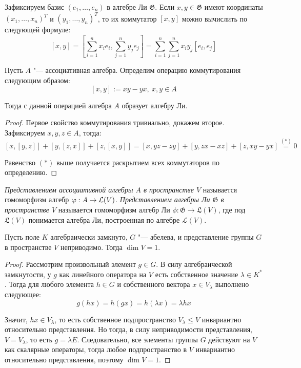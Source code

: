 \begin{note}
	Зафиксируем базис $(e_1, \dotsc, e_n)$ в алгебре Ли $\mathfrak G$. Если $x, y \in \mathfrak G$ имеют координаты $(x_1, \dotsc, x_n)^T$ и $(y_1, \dotsc, y_n)^T$, то их коммутатор $[x, y]$ можно вычислить по следующей формуле:
	\[[x, y] = \left[\sum_{i=1}^nx_ie_i, \sum_{j=1}^ny_je_j\right] = \sum_{i=1}^n\sum_{j=1}^nx_iy_j[e_i, e_j]\]
\end{note}

\begin{proposition}
	Пусть $A$ "--- ассоциативная алгебра. Определим операцию коммутирования следующим образом:
	\[[x, y] := xy - yx,~x, y \in A\]
	
	Тогда с данной операцией алгебра $A$ образует алгебру Ли.
\end{proposition}

\begin{proof}
	Первое свойство коммутирования тривиально, докажем второе. Зафиксируем $x, y, z \in A$, тогда:
	\[[x, [y, z]] + [y, [z, x]] + [z, [x, y]] = [x, yz - zy] + [y, zx - xz] + [z, xy - yx] \stackrel{(*)}{=} 0\]
	
	Равенство $(*)$ выше получается раскрытием всех коммутаторов по определению.
\end{proof}

\begin{definition}
	\textit{Представлением ассоциативной алгебры $A$ в пространстве $V$} называется гомоморфизм алгебр $\varphi : A \to \mathcal L(V)$. \textit{Представлением алгебры Ли $\mathfrak G$ в пространстве $V$} называется гомоморфизм алгебр Ли $\phi : \mathfrak{G} \to \mathfrak{L}(V)$, где под $\mathfrak{L}(V)$ понимается алгебра Ли, построенная по алгебре $\mathcal L(V)$.
\end{definition}

\begin{proposition}
	Пусть поле $K$ алгебраически замкнуто, $G$ "--- абелева, и представление группы $G$ в пространстве $V$ неприводимо. Тогда $\dim {V} = 1$.
\end{proposition}

\begin{proof}
	Рассмотрим произвольный элемент $g \in G$. В силу алгебраической замкнутости, у $g$ как линейного оператора на $V$ есть собственное значение $\lambda \in K^*$. Тогда для любого элемента $h \in G$ и собственного вектора $x \in V_{\lambda}$ выполнено следующее:
	\[g(hx) = h(gx) = h(\lambda x) = \lambda hx\]
	
	Значит, $hx \in V_{\lambda}$, то есть собственное подпространство $V_{\lambda} \le V$ инвариантно относительно представления. Но тогда, в силу неприводимости представления, $V = V_{\lambda}$, то есть $g = \lambda E$. Следовательно, все элементы группы $G$ действуют на $V$ как скалярные операторы, тогда любое подпространство в $V$ инвариантно относительно представления, поэтому $\dim{V} = 1$.
\end{proof}

